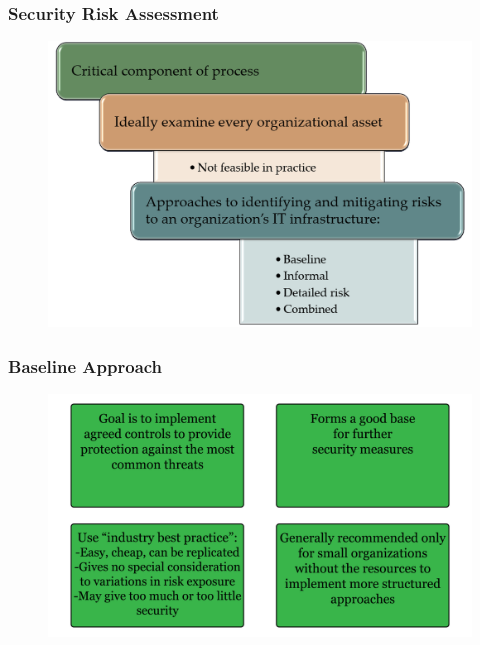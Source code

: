 \documentclass[xcolor ={table,usenames,dvipsnames}]{beamer}
\theoremstyle{definition}
\begin{document}
	\begin{frame}
		\frametitle{Security Risk Assessment}
		\begin{figure}[h!]
			\centering
			\includegraphics[scale=0.25]{img/img_05.PNG}
			\label{Interfacce di un CS}
		\end{figure}
	\end{frame}

		
	\begin{frame}
		\frametitle{Baseline Approach}
			\begin{figure}[h!]
				\centering
				\includegraphics[scale=0.23]{img/img_06.PNG}
				\label{Interfacce di un CS}
			\end{figure}
	\end{frame}
	
\end{document}
